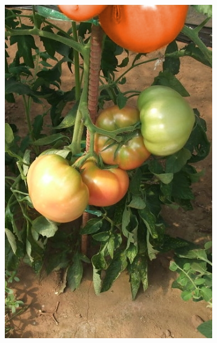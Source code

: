 \begin{figure}[t]
  \centering
  \begin{subfigure}[b]{0.24\linewidth}
    \includegraphics[width=\textwidth]{0}
  \end{subfigure}
  \hspace{\fill}
  ~
  \begin{subfigure}[b]{0.24\linewidth}

\end{subfigure}
\end{figure}
